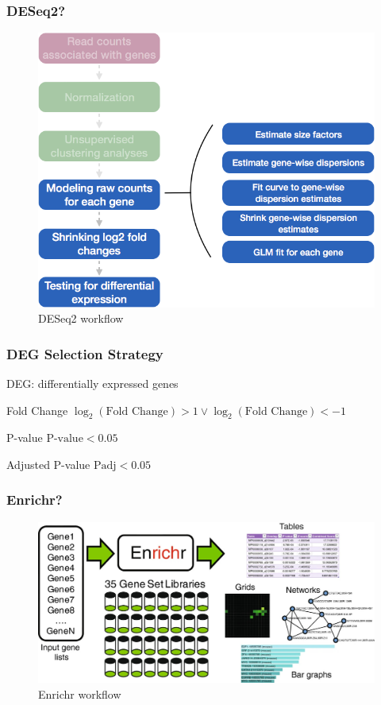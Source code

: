 \documentclass{beamer}
\begin{document}
    \begin{frame}
        \frametitle{DESeq2?}

        \begin{figure}
            \includegraphics[width=0.5 \linewidth]{figures/Workflow/DESeq2.png}
            \caption{DESeq2 workflow \protect\cite{DESeq1}}
        \end{figure}
    \end{frame}

    \begin{frame}
        \frametitle{DEG Selection Strategy}
        DEG: differentially expressed genes

        \begin{block}{Fold Change}
            $\log_{2}(\text{Fold Change}) > 1 \vee \log_{2}(\text{Fold Change}) < -1$
        \end{block}

        \begin{block}{P-value}
            $\text{P-value} < 0.05$
        \end{block}

        \begin{block}{Adjusted P-value}
            $\text{Padj} < 0.05$
        \end{block}
    \end{frame}

    \begin{frame}
        \frametitle{Enrichr?}

        \begin{figure}
            \includegraphics[width=0.8 \linewidth]{figures/Workflow/Enrichr.jpg}
            \caption{Enrichr workflow \protect\cite{Enrichr1, Enrichr2}}
        \end{figure}
    \end{frame}
\end{document}
